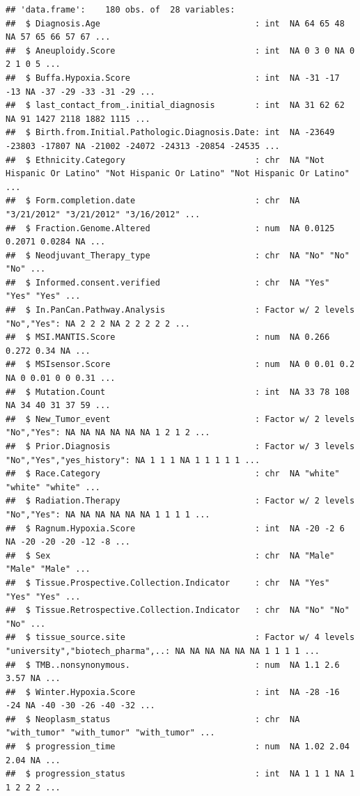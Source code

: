 \documentclass[
  11pt,
]{article}
\begin{document}
\begin{verbatim}
## 'data.frame':    180 obs. of  28 variables:
##  $ Diagnosis.Age                               : int  NA 64 65 48 NA 57 65 66 57 67 ...
##  $ Aneuploidy.Score                            : int  NA 0 3 0 NA 0 2 1 0 5 ...
##  $ Buffa.Hypoxia.Score                         : int  NA -31 -17 -13 NA -37 -29 -33 -31 -29 ...
##  $ last_contact_from_.initial_diagnosis        : int  NA 31 62 62 NA 91 1427 2118 1882 1115 ...
##  $ Birth.from.Initial.Pathologic.Diagnosis.Date: int  NA -23649 -23803 -17807 NA -21002 -24072 -24313 -20854 -24535 ...
##  $ Ethnicity.Category                          : chr  NA "Not Hispanic Or Latino" "Not Hispanic Or Latino" "Not Hispanic Or Latino" ...
##  $ Form.completion.date                        : chr  NA "3/21/2012" "3/21/2012" "3/16/2012" ...
##  $ Fraction.Genome.Altered                     : num  NA 0.0125 0.2071 0.0284 NA ...
##  $ Neodjuvant_Therapy_type                     : chr  NA "No" "No" "No" ...
##  $ Informed.consent.verified                   : chr  NA "Yes" "Yes" "Yes" ...
##  $ In.PanCan.Pathway.Analysis                  : Factor w/ 2 levels "No","Yes": NA 2 2 2 NA 2 2 2 2 2 ...
##  $ MSI.MANTIS.Score                            : num  NA 0.266 0.272 0.34 NA ...
##  $ MSIsensor.Score                             : num  NA 0 0.01 0.2 NA 0 0.01 0 0 0.31 ...
##  $ Mutation.Count                              : int  NA 33 78 108 NA 34 40 31 37 59 ...
##  $ New_Tumor_event                             : Factor w/ 2 levels "No","Yes": NA NA NA NA NA NA 1 2 1 2 ...
##  $ Prior.Diagnosis                             : Factor w/ 3 levels "No","Yes","yes_history": NA 1 1 1 NA 1 1 1 1 1 ...
##  $ Race.Category                               : chr  NA "white" "white" "white" ...
##  $ Radiation.Therapy                           : Factor w/ 2 levels "No","Yes": NA NA NA NA NA NA 1 1 1 1 ...
##  $ Ragnum.Hypoxia.Score                        : int  NA -20 -2 6 NA -20 -20 -20 -12 -8 ...
##  $ Sex                                         : chr  NA "Male" "Male" "Male" ...
##  $ Tissue.Prospective.Collection.Indicator     : chr  NA "Yes" "Yes" "Yes" ...
##  $ Tissue.Retrospective.Collection.Indicator   : chr  NA "No" "No" "No" ...
##  $ tissue_source.site                          : Factor w/ 4 levels "university","biotech_pharma",..: NA NA NA NA NA NA 1 1 1 1 ...
##  $ TMB..nonsynonymous.                         : num  NA 1.1 2.6 3.57 NA ...
##  $ Winter.Hypoxia.Score                        : int  NA -28 -16 -24 NA -40 -30 -26 -40 -32 ...
##  $ Neoplasm_status                             : chr  NA "with_tumor" "with_tumor" "with_tumor" ...
##  $ progression_time                            : num  NA 1.02 2.04 2.04 NA ...
##  $ progression_status                          : int  NA 1 1 1 NA 1 1 2 2 2 ...
\end{verbatim}
\end{document}

